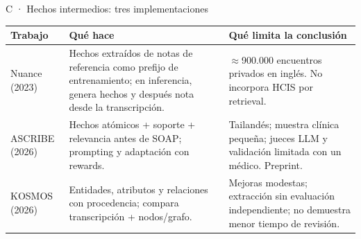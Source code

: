 \documentclass[aspectratio=169,10pt]{beamer}
\begin{document}
\begin{frame}[noframenumbering]{C · Hechos intermedios: tres implementaciones}
  {\fontsize{8}{10}\selectfont
  \begin{tabularx}{\textwidth}{L{2.15cm}L{5.4cm}X}
    \toprule \textbf{Trabajo} & \textbf{Qué hace} & \textbf{Qué limita la conclusión}\\\midrule
    Nuance (2023) & Hechos extraídos de notas de referencia como prefijo de entrenamiento; en inferencia, genera hechos y después nota desde la transcripción. & $\approx$900.000 encuentros privados en inglés. No incorpora HCIS por retrieval.\\
    ASCRIBE (2026) & Hechos atómicos + soporte + relevancia antes de SOAP; prompting y adaptación con rewards. & Tailandés; muestra clínica pequeña; jueces LLM y validación limitada con un médico. Preprint.\\
    KOSMOS (2026) & Entidades, atributos y relaciones con procedencia; compara transcripción + nodos/grafo. & Mejoras modestas; extracción sin evaluación independiente; no demuestra menor tiempo de revisión.\\
    \bottomrule
  \end{tabularx}}
\end{frame}
\end{document}
